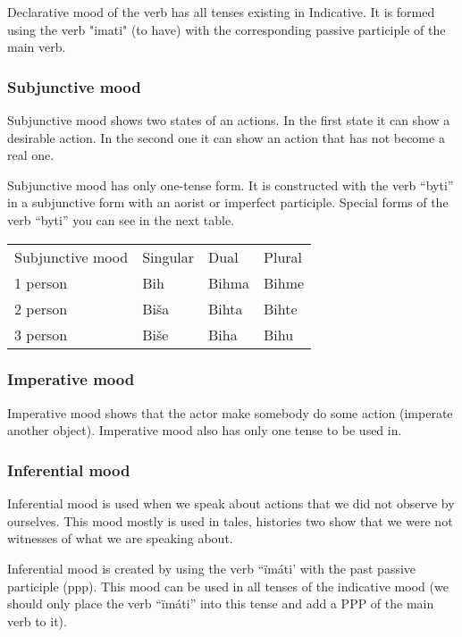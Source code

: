 Declarative mood of the verb has all tenses existing in Indicative. It is formed using the verb "imati" (to have) with the corresponding passive participle of the main verb.

\subsubsection{Subjunctive mood}

Subjunctive mood shows two states of an actions. In the first state it can show a desirable action. In the second one it can show an action that has not become a real one. 

Subjunctive mood has only one-tense form. It is constructed with the verb “byti” in a subjunctive form with an aorist or imperfect participle. Special forms of the verb “byti” you can see in the next table.

\begin{table}[!htb]
	\begin{tabular}{llll}
		Subjunctive mood & Singular & Dual & Plural \\
		1 person & Bih & Bihma & Bihme \\
		2 person & Biša & Bihta & Bihte \\
		3 person & Biše & Biha & Bihu
	\end{tabular}
\end{table}

\subsubsection{Imperative mood}

Imperative mood shows that the actor make somebody do some action (imperate another object). Imperative mood also has only one tense to be used in. 

\subsubsection{Inferential mood}

Inferential mood is used when we speak about actions that we did not observe by ourselves. This mood mostly is used in tales, histories two show that we were not witnesses of what we are speaking about.


Inferential mood is created by using the verb “ïmáti’ with the past passive participle (\gls{ppp}). This mood can be used in all tenses of the indicative mood (we should only place the verb “ïmáti” into this tense and add a PPP of the main verb to it). 

